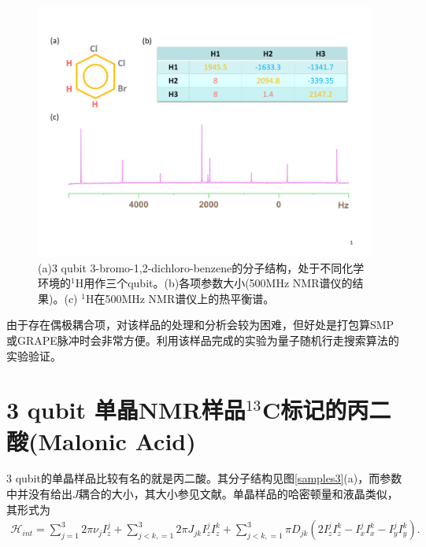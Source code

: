 \begin{figure}[htbp]
            \begin{center}
              \includegraphics[width= 0.8\columnwidth]{figures/samplelq3.pdf}
              \caption{(a)3 qubit 3-bromo-1,2-dichloro-benzene的分子结构，处于不同化学环境的$^{1}$H用作三个qubit。(b)各项参数大小(500MHz NMR谱仪的结果)。(c) $^{1}$H在500MHz NMR谱仪上的热平衡谱。}
              \label{samplelq3}
            \end{center}
\end{figure}

由于存在偶极耦合项，对该样品的处理和分析会较为困难，但好处是打包算SMP或GRAPE脉冲时会非常方便。利用该样品完成的实验为量子随机行走搜索算法的实验验证\cite{rw1}。

\section{3 qubit 单晶NMR样品$^{13}$C标记的丙二酸(Malonic Acid)}

3 qubit的单晶样品比较有名的就是丙二酸。其分子结构见图\ref{samples3}(a)，而参数中并没有给出$J$耦合的大小，其大小参见文献\cite{app24}。单晶样品的哈密顿量和液晶类似，其形式为
\begin{eqnarray}
\mathcal{H}_{int}=\sum\limits_{j=1}^3 {2\pi \nu _j } I_z^j  + \sum\limits_{j < k,=1}^3 {2\pi} J_{jk} I_z^j I_z^k+\sum\limits_{j < k,=1}^3 {\pi} D_{jk}(2I_z^jI_z^k-I_x^jI_x^k-I_y^jI_y^k).
\end{eqnarray}

